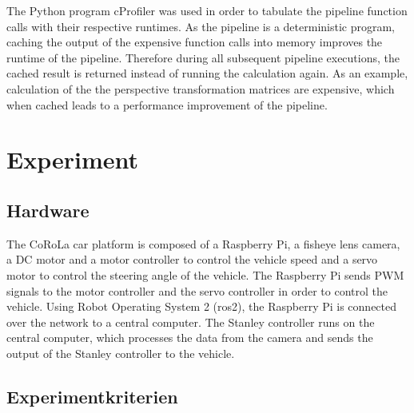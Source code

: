\documentclass[arbeit=studie,oneside,BCOR=12mm]{ArbeitRST}
\begin{document}
The Python program cProfiler was used in order to tabulate the pipeline
function calls with their respective runtimes. As the pipeline is a
deterministic program, caching the output of the expensive function calls into
memory improves the runtime of the pipeline. Therefore during all subsequent
pipeline executions, the cached result is returned instead of running the
calculation again. As an example, calculation of the the perspective
transformation matrices are expensive, which when cached leads to a performance
improvement of the pipeline.

\iffalse

In order to prove the performance improvement of the pipeline, an experiment
was implemented. First, the pipeline is executed once and the runtime ignored
as the performance improvement is only relevant to subsequent executions of the
pipeline. Therefore, on the second execution of the pipeline, the runtime is
measured for both pipeline variants, with and without caching the expensive
function calls from the first execution. The experiment is then run 100 times
and the result tabulated. The arithmetic mean of the runtimes for both variants
are then compared to one another to measure the speed improvement. The values
are in TABLE, showing that by caching the expensive function calls, the
pipeline processing speed improved by VALUE%

\fi

\chapter{Experiment}
\section{Hardware}

The CoRoLa car platform is composed of a Raspberry Pi, a fisheye lens camera, a
DC motor and a motor controller to control the vehicle speed and a servo motor
to control the steering angle of the vehicle. The Raspberry Pi sends PWM
signals to the motor controller and the servo controller in order to control
the vehicle. Using Robot Operating System 2 (ros2), the Raspberry Pi is
connected over the network to a central computer. The Stanley controller runs
on the central computer, which processes the data from the camera and sends the
output of the Stanley controller to the vehicle.

\section{Experimentkriterien}
\end{document}
